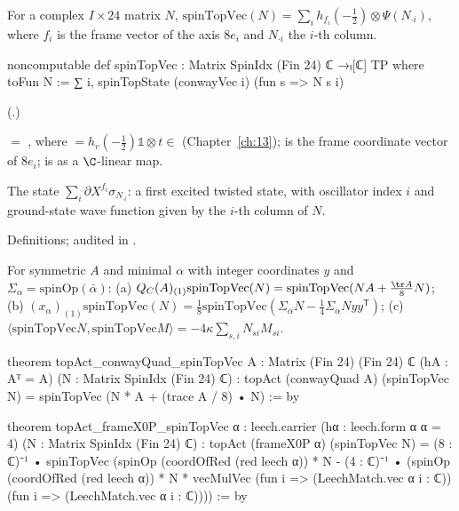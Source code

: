 \begin{definition}\label{ch21:def:spinTopVec}
For a complex $I\times24$ matrix $N$, $\mathrm{spinTopVec}(N)=\sum_ih_{f_i}(-\tfrac12)\otimes\Psi(N_{\cdot i})$,
where $f_i$ is the frame vector of the axis $8e_i$ and $N_{\cdot i}$ the $i$-th column.
\end{definition}
\begin{leancode}
noncomputable def spinTopVec : Matrix SpinIdx (Fin 24) ℂ →ₗ[ℂ] TP where
  toFun N := ∑ i, spinTopState (conwayVec i) (fun s => N s i)
\end{leancode}
(.)
\begin{dictionary}
 $=$ , where  $=h_v(-\tfrac12)\mathbb1\otimes t\in$
 (Chapter~\ref{ch:13});  is
the frame coordinate vector of $8e_i$;  is  as a $\C$-linear map.
\end{dictionary}
\begin{physics}
The state $\sum_i\partial X^{f_i}\sigma_{N_{\cdot i}}$: a first excited twisted state, with oscillator
index $i$ and ground-state wave function given by the $i$-th column of $N$.
\end{physics}
\begin{status}
Definitions; audited in .
\end{status}
\begin{theorem}\label{ch21:thm:twistedTop}
For symmetric $A$ and minimal $\alpha$ with integer coordinates $y$ and $\Sigma_\alpha=\mathrm{spinOp}(\bar\alpha)$:
(a) $Q_C(A)_{(1)}\mathrm{spinTopVec}(N)=\mathrm{spinTopVec}(NA+\tfrac{\tr A}8N)$;
(b) $(x_\alpha)_{(1)}\mathrm{spinTopVec}(N)=\tfrac18\mathrm{spinTopVec}(\Sigma_\alpha N-\tfrac14\Sigma_\alpha Nyy^{\mathsf T})$;
(c) $\langle\mathrm{spinTopVec}N,\mathrm{spinTopVec}M\rangle=-4\kappa\sum_{s,i}N_{si}M_{si}$.
\end{theorem}
\begin{leancode}
theorem topAct_conwayQuad_spinTopVec {A : Matrix (Fin 24) (Fin 24) ℂ} (hA : Aᵀ = A)
    (N : Matrix SpinIdx (Fin 24) ℂ) :
    topAct (conwayQuad A) (spinTopVec N) = spinTopVec (N * A + (trace A / 8) • N) := by
\end{leancode}
\begin{leancode}
theorem topAct_frameX0P_spinTopVec {α : leech.carrier} (hα : leech.form α α = 4)
    (N : Matrix SpinIdx (Fin 24) ℂ) :
    topAct (frameX0P α) (spinTopVec N)
      = (8 : ℂ)⁻¹ • spinTopVec (spinOp (coordOfRed (red leech α)) * N
          - (4 : ℂ)⁻¹ • (spinOp (coordOfRed (red leech α)) * N
              * vecMulVec (fun i => (LeechMatch.vec α i : ℂ)) (fun i => (LeechMatch.vec α i : ℂ)))) := by
\end{leancode}
